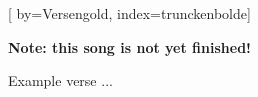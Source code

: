 

[%
    by={Versengold},
    index={trunckenbolde}]


    \label{trunckenbolde}

    \textbf{Note: this song is not yet finished!}

    \beginverse
        Example verse ...
    \endverse
\endsong
